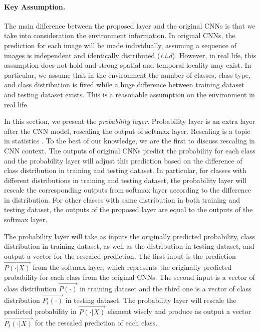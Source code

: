 \documentclass[pageno]{jpaper}
\begin{document}
\paragraph{Key Assumption. } 
The main difference between the proposed layer and the original CNNs is that we take into consideration the environment information. In original CNNs, the prediction for each image will be made individually, assuming a sequence of images is independent and identically distributed (\textit{i.i.d}). However, in real life, this assumption does not hold and strong spatial and temporal locality may exist. In particular, we assume that in the environment the number of classes, class type, and class distribution is fixed while a huge difference between training dataset and testing dataset exists. This is a reasonable assumption on the environment in real life. 


In this section, we present the \textit{probability layer}. Probability layer is an extra layer after the CNN model, rescaling the output of softmax layer. Rescaling is a topic in statistics \cite{saerens2002adjusting}. To the best of our knowledge, we are the first to discuss rescaling in CNN context. The outputs of original CNNs predict the probability for each class and the probability layer will adjust this prediction based on the difference of class distribution in training and testing dataset. In particular, for classes with different distributions in training and testing dataset, the probability layer will rescale the corresponding outputs from softmax layer according to the difference in distribution. For other classes with same distribution in both training and testing dataset, the outputs of the proposed layer are equal to the outputs of the softmax layer. 


The probability layer will take as inputs the originally predicted probability, class distribution in training dataset, as well as the distribution in testing dataset, and output a vector for the rescaled prediction. The first input is the prediction $\vec{P(\cdot|X)}$ from the softmax layer, which represents the originally predicted probability for each class from the original CNNs. The second input is a vector of class distribution $\vec{P(\cdot)}$ in training dataset and the third one is a vector of class distribution $\vec{P_t(\cdot)}$ in testing dataset. The probability layer will rescale the predicted probability in $\vec{P(\cdot|X)}$ element wisely and produce as output a vector $\vec{P_t(\cdot|X)}$ for the rescaled prediction of each class.
\end{document}
